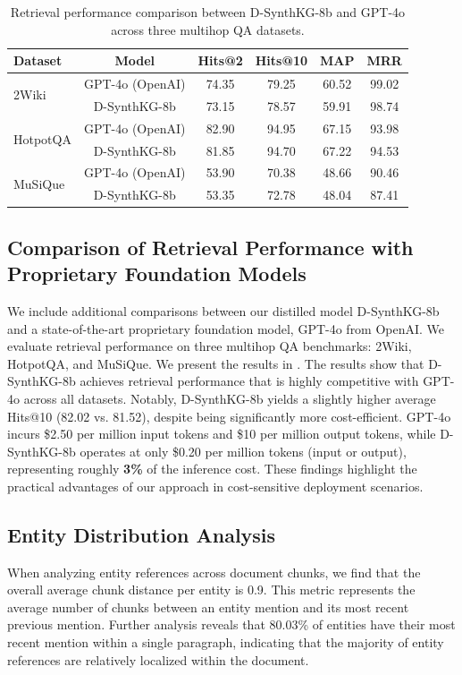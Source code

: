 \documentclass{article} %
\begin{document}
\begin{table}[ht]
\centering
\small
\begin{tabular}{@{}lccccc@{}}
\toprule
\textbf{Dataset} & \textbf{Model} & \textbf{Hits@2} & \textbf{Hits@10} & \textbf{MAP} & \textbf{MRR} \\
\midrule
\multirow{2}{*}{2Wiki} 
    & GPT-4o (OpenAI) & 74.35 & 79.25 & 60.52 & 99.02 \\
    & D-SynthKG-8b    & 73.15 & 78.57 & 59.91 & 98.74 \\
\midrule
\multirow{2}{*}{HotpotQA} 
    & GPT-4o (OpenAI) & 82.90 & 94.95 & 67.15 & 93.98 \\
    & D-SynthKG-8b    & 81.85 & 94.70 & 67.22 & 94.53 \\
\midrule
\multirow{2}{*}{MuSiQue} 
    & GPT-4o (OpenAI) & 53.90 & 70.38 & 48.66 & 90.46 \\
    & D-SynthKG-8b    & 53.35 & 72.78 & 48.04 & 87.41 \\
\bottomrule
\end{tabular}
\caption{Retrieval performance comparison between D-SynthKG-8b and GPT-4o across three multihop QA datasets.}
\label{tab:gpt4o_comparison}
\end{table}



\subsection{Comparison of Retrieval Performance with Proprietary Foundation Models}
\label{sec:appendix_gpt4o}

We include additional comparisons between our distilled model D-SynthKG-8b and a state-of-the-art proprietary foundation model, GPT-4o from OpenAI. We evaluate retrieval performance on three multihop QA benchmarks: 2Wiki, HotpotQA, and MuSiQue. We present the results in .
The results show that D-SynthKG-8b achieves retrieval performance that is highly competitive with GPT-4o across all datasets. Notably, D-SynthKG-8b yields a slightly higher average Hits@10 (82.02 vs. 81.52), despite being significantly more cost-efficient. GPT-4o incurs \$2.50 per million input tokens and \$10 per million output tokens, while D-SynthKG-8b operates at only \$0.20 per million tokens (input or output), representing roughly \textbf{3\%} of the inference cost. These findings highlight the practical advantages of our approach in cost-sensitive deployment scenarios.

\subsection{Entity Distribution Analysis}
When analyzing entity references across document chunks, we find that the overall average chunk distance per entity is 0.9. This metric represents the average number of chunks between an entity mention and its most recent previous mention. Further analysis reveals that 80.03\% of entities have their most recent mention within a single paragraph, indicating that the majority of entity references are relatively localized within the document.
\end{document}
